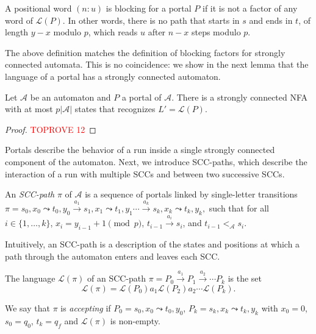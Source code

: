 \documentclass[letterpaper, USenglish, cleveref, autoref, thm-restate, numberwithinsect]{lipics-v2021}
\theoremstyle{theorem}
\theoremstyle{definition}
\newcommand{\Aa}{\mathcal{A}}
\newcommand{\curly}{\mathrel{\leadsto}}
\newcommand{\lang}[1]{\mathcal{L}(#1)}
\newcommand{\portal}[4]{#1,#2 \curly #3, #4}
\newcommand{\SCCpath}{\pi}
\newcommand{\set}[1]{\{ #1 \}}
\newcommand{\timedword}[2]{(#1:#2)}
\begin{document}
\begin{definition}
	A positional word $\timedword{n}{u}$ is blocking for a portal $P$ if it is not a factor of any word of $\lang{P}$.
	In other words, there is no path that starts in $s$ and ends in $t$, of length $y-x$ modulo $p$, which reads $u$ after $n-x$ steps modulo $p$.
\end{definition}

The above definition matches the definition of blocking factors for strongly connected automata. This is no coincidence: we show in the next lemma that the language of a portal has a strongly connected automaton.
\begin{lemma}\label{lemma:portal-to-SC}
    Let $\Aa$ be an automaton and $P$ a portal of $\Aa$.
    There is a strongly connected NFA with at most $p|\Aa|$ states that recognizes $L' = \lang{P}$.
\end{lemma}
\begin{proof}\textcolor{red}{TOPROVE 12}\end{proof}

Portals describe the behavior of a run inside a single strongly connected component of the automaton.
Next, we introduce SCC-paths, which describe the interaction of a run with multiple SCCs and between two successive SCCs.
\begin{definition}
	An \emph{SCC-path} $\pi$ of $\Aa$ is a sequence of portals linked by single-letter transitions
	\(\SCCpath = \portal{s_0}{x_0}{t_0}{y_0} \xrightarrow{a_1} \portal{s_1}{x_1}{t_1}{y_1} \cdots  \xrightarrow{a_{k}} \portal{s_k}{x_k}{t_k}{y_k},\)
	such that for all $i \in \set{1, \ldots, k}$,  $x_i = y_{i-1} +1 \pmod{p}$, $t_{i-1}\xrightarrow{a_i} s_{i}$, and $t_{i-1}  <_{\Aa} s_i$.
\end{definition}
Intuitively, an SCC-path is a description of the states and positions at which a path through the automaton enters and leaves each SCC.

\begin{definition}\label{def:lang-of-sccpath}
	The language $\lang{\SCCpath}$ of an SCC-path $\SCCpath = P_0 \xrightarrow{a_1} P_1 \xrightarrow{a_2}\cdots  P_k$ is the set 
	\[\lang{\SCCpath} = \lang{P_0} a_1 \lang{P_2} a_2 \cdots \lang{P_k}.\]
\end{definition}

We say that $\SCCpath$ is \emph{accepting} if $P_0 = \portal{s_0}{x_0}{t_0}{y_0}$, $P_k = \portal{s_k}{x_k}{t_k}{y_k}$ with $x_0 = 0$, $s_0 = q_{0}$, $t_k = q_{f}$ and $\lang{\SCCpath}$ is non-empty.
\end{document}
